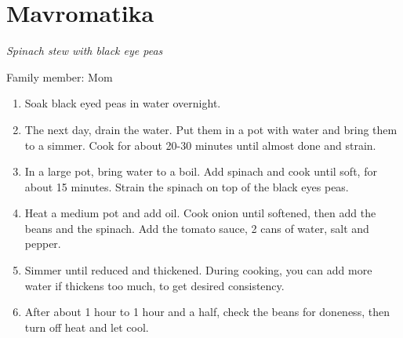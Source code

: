 \chapter{Mavromatika}
\label{ch:mavromatika}
\textit{Spinach stew with black eye peas}

Family member: Mom



\begin{enumerate}
    \item Soak black eyed peas in water overnight.
    \item The next day, drain the water. Put them in a pot with water and bring them to a simmer. Cook for about 20-30 minutes until almost done and strain.
    \item In a large pot, bring water to a boil. Add spinach and cook until soft, for about 15 minutes. Strain the spinach on top of the black eyes peas.
    \item Heat a medium pot and add oil. Cook onion until softened, then add the beans and the spinach. Add the tomato sauce, 2 cans of water, salt and pepper.
    \item Simmer until reduced and thickened. During cooking, you can add more water if thickens too much, to get desired consistency.
    \item After about 1 hour to 1 hour and a half, check the beans for doneness, then turn off heat and let cool.
\end{enumerate}

